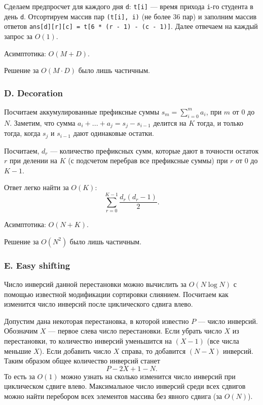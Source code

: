 
Сделаем предпросчет для каждого дня {\tt d}: {\tt t[i]} --- время прихода {\tt i}-го студента в день {\tt d}. Отсортируем массив пар {\tt (t[i], i)} (не более 36 пар) и заполним массив ответов {\tt ans[d][r][c] = t[6 * (r - 1) - (c - 1)]}. Далее отвечаем на каждый запрос за $O(1)$.

Асимптотика: $O(M + D)$. 

Решение за $O(M \cdot D)$ было лишь частичным.

\subsubsection*{D. Decoration}



Посчитаем аккумулированные префиксные суммы $s_m = \sum_{i=0}^m a_i$, при $m$ от 0 до $N$. Заметим, что сумма $a_{i} + ... + a_{j} = s_j - s_{i-1}$ делится на $K$ тогда, и только тогда, когда $s_j$ и $s_{i-1}$ дают одинаковые остатки. 

Посчитаем, $d_r$ --- количество префиксных сумм, которые дают в точности остаток $r$ при делении на $K$ (с подсчетом перебрав все префиксные суммы) при $r$ от 0 до $K-1$. 

Ответ легко найти за $O(K)$: $$\sum\limits_{r = 0}^{K-1} \frac{d_r(d_r - 1)}{2}.$$

Асимптотика: $O(N + K)$. 

Решение за $O(N^2)$ было лишь частичным.

\subsubsection*{E. Easy shifting}



Число инверсий данной перестановки можно вычислить за $O(N \log N)$ с помощью известной модификации сортировки слиянием. Посчитаем как изменится число инверсий после циклического сдвига влево.

Допустим дана некоторая перестановка, в которой известно $P$ --- число инверсий. Обозначим $X$ --- первое слева число перестановки. Если убрать число $X$ из перестановки, то количество инверсий уменьшится на $(X - 1)$ (все числа меньшие $X$). Если добавить число $X$ справа, то добавится $(N - X)$ инверсий. Таким образом общее количество инверсий станет $$P - 2 X + 1 - N.$$ 
То есть за $O(1)$ можно узнать на сколько изменится число инверсий при циклическом сдвиге влево. Максимальное число инверсий среди всех сдвигов можно найти перебором всех элементов массива без явного сдвига (за $O(N)$).

